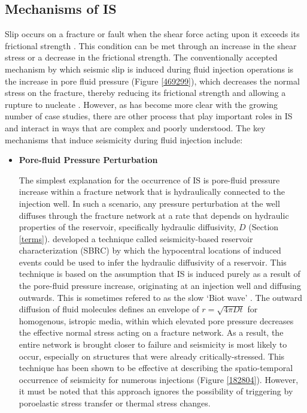 \subsection{Mechanisms of IS}\label{mechanisms}
Slip occurs on a fracture or fault when the shear force acting upon it exceeds its frictional strength \citep{stein_2000}. This condition can be met through an increase in the shear stress or a decrease in the frictional strength. The conventionally accepted mechanism by which seismic slip is induced during fluid injection operations is the increase in pore fluid pressure (Figure \ref{469299}), which decreases the normal stress on the fracture, thereby reducing its frictional strength and allowing a rupture to nucleate \cite[e.g.][]{Majer_2007}. However, as has become more clear with the growing number of case studies, there are other process that play important roles in IS and interact in ways that are complex and poorly understood. The key mechanisms that induce seismicity during fluid injection include:
\begin{itemize}
  \item{\textbf{Pore-fluid Pressure Perturbation}}
  
  The simplest explanation for the occurrence of IS is pore-fluid pressure increase within a fracture network that is hydraulically connected to the injection well. In such a scenario, any pressure perturbation at the well diffuses through the fracture network at a rate that depends on hydraulic properties of the reservoir, specifically hydraulic diffusivity, $D$ (Section \ref{terms}). \citet{Shapiro_2002} developed a technique called seismicity-based reservoir characterization (SBRC) by which the hypocentral locations of induced events could be used to infer the hydraulic diffusivity of a reservoir. This technique is based on the assumption that IS is induced purely as a result of the pore-fluid pressure increase, originating at an injection well and diffusing outwards. This is sometimes refered to as the slow `Biot wave' \citep{Biot_1956}. The outward diffusion of fluid molecules defines an envelope of $r = \sqrt{4\pi{D}t}$ for homogenous, istropic media, within which elevated pore pressure decreases the effective normal stress acting on a fracture network. As a result, the entire network is brought closer to failure and seismicity is most likely to occur, especially on structures that were already critically-stressed. This technique has been shown to be effective at describing the spatio-temporal occurrence of seismicity for numerous injections \citep[e.g.][]{Shapiro_1997,Shapiro_2009,Parotidis_2004,Jeanne_2014} (Figure \ref{182804}). However, it must be noted that this approach ignores the possibility of triggering by poroelastic stress transfer or thermal stress changes.
\end{itemize}

